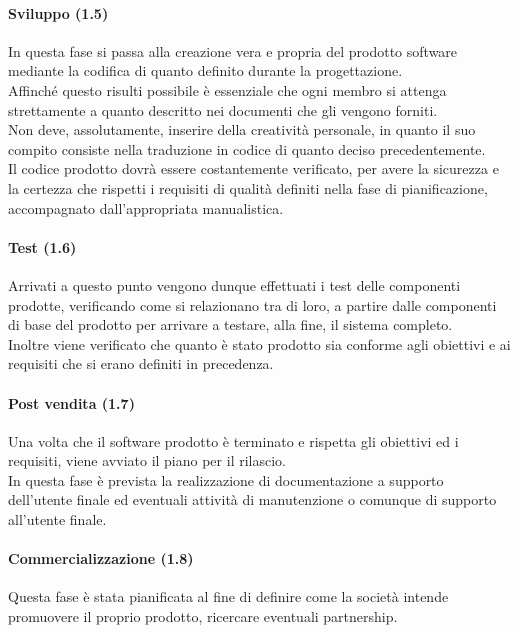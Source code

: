 \paragraph{Sviluppo (1.5)}
In questa fase si passa alla creazione vera e propria del prodotto software mediante la codifica di quanto definito durante la progettazione.\\
Affinché questo risulti possibile \`{e} essenziale che ogni membro si attenga strettamente a quanto descritto nei documenti che gli vengono forniti.\\
Non deve, assolutamente, inserire della creativit\`{a} personale, in quanto il suo compito consiste nella traduzione in codice di quanto deciso precedentemente.\\
Il codice prodotto dovr\`{a} essere costantemente verificato, per avere la sicurezza e la certezza che rispetti i requisiti di qualit\`{a} definiti nella fase di pianificazione, accompagnato dall'appropriata manualistica.

\paragraph{Test (1.6)}
Arrivati a questo punto vengono dunque effettuati i test delle componenti prodotte, verificando come si relazionano tra di loro, a partire dalle componenti di base del prodotto per arrivare a testare, alla fine, il sistema completo.\\
Inoltre viene verificato che quanto \`{e} stato prodotto sia conforme agli obiettivi e ai requisiti che si erano definiti in precedenza.

\paragraph{Post vendita (1.7)}
Una volta che il software prodotto \`{e} terminato e rispetta gli obiettivi ed i requisiti, viene avviato il piano per il rilascio.\\
In questa fase \`{e} prevista la realizzazione di documentazione a supporto dell'utente finale ed eventuali attivit\`{a} di manutenzione o comunque di supporto all'utente finale.\\

\paragraph{Commercializzazione (1.8)}
Questa fase \`{e} stata pianificata al fine di definire come la societ\`{a} intende promuovere il proprio prodotto, ricercare eventuali partnership.


